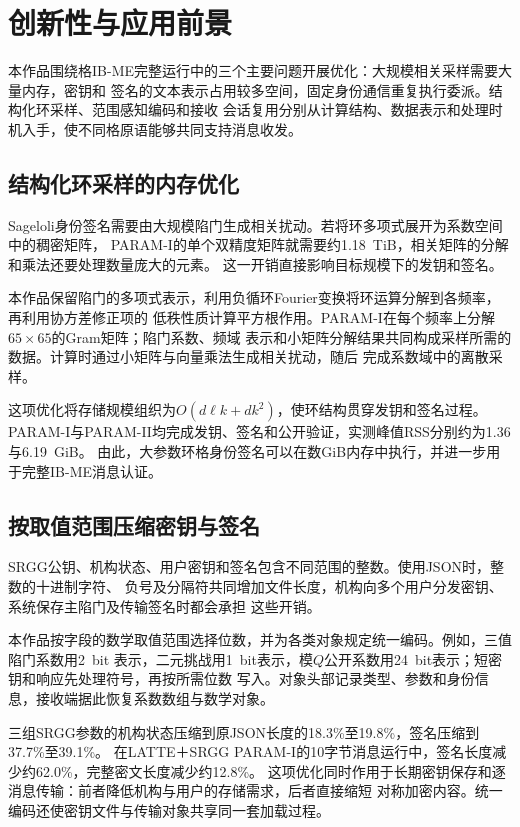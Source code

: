 \chapter{创新性与应用前景}

本作品围绕格IB-ME完整运行中的三个主要问题开展优化：大规模相关采样需要大量内存，密钥和
签名的文本表示占用较多空间，固定身份通信重复执行委派。结构化环采样、范围感知编码和接收
会话复用分别从计算结构、数据表示和处理时机入手，使不同格原语能够共同支持消息收发。

\section{结构化环采样的内存优化}

Sageloli身份签名需要由大规模陷门生成相关扰动。若将环多项式展开为系数空间中的稠密矩阵，
PARAM-I的单个双精度矩阵就需要约1.18~TiB，相关矩阵的分解和乘法还要处理数量庞大的元素。
这一开销直接影响目标规模下的发钥和签名。

本作品保留陷门的多项式表示，利用负循环Fourier变换将环运算分解到各频率，再利用协方差修正项的
低秩性质计算平方根作用。PARAM-I在每个频率上分解$65\times65$的Gram矩阵；陷门系数、频域
表示和小矩阵分解结果共同构成采样所需的数据。计算时通过小矩阵与向量乘法生成相关扰动，随后
完成系数域中的离散采样。

这项优化将存储规模组织为$O(d\ell k+dk^2)$，使环结构贯穿发钥和签名过程。
PARAM-I与PARAM-II均完成发钥、签名和公开验证，实测峰值RSS分别约为1.36与6.19~GiB。
由此，大参数环格身份签名可以在数GiB内存中执行，并进一步用于完整IB-ME消息认证。

\section{按取值范围压缩密钥与签名}

SRGG公钥、机构状态、用户密钥和签名包含不同范围的整数。使用JSON时，整数的十进制字符、
负号及分隔符共同增加文件长度，机构向多个用户分发密钥、系统保存主陷门及传输签名时都会承担
这些开销。

本作品按字段的数学取值范围选择位数，并为各类对象规定统一编码。例如，三值陷门系数用2~bit
表示，二元挑战用1~bit表示，模$Q$公开系数用24~bit表示；短密钥和响应先处理符号，再按所需位数
写入。对象头部记录类型、参数和身份信息，接收端据此恢复系数数组与数学对象。

三组SRGG参数的机构状态压缩到原JSON长度的18.3\%至19.8\%，签名压缩到37.7\%至39.1\%。
在LATTE＋SRGG PARAM-I的10字节消息运行中，签名长度减少约62.0\%，完整密文长度减少约12.8\%。
这项优化同时作用于长期密钥保存和逐消息传输：前者降低机构与用户的存储需求，后者直接缩短
对称加密内容。统一编码还使密钥文件与传输对象共享同一套加载过程。

